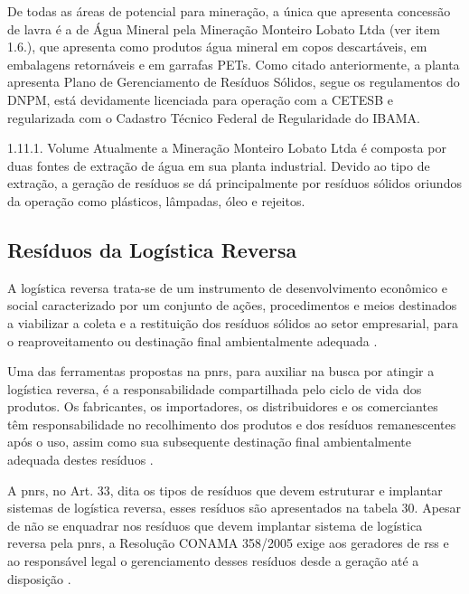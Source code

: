	De todas as áreas de potencial para mineração, a única que apresenta concessão de lavra é a de Água Mineral pela Mineração Monteiro Lobato Ltda (ver item 1.6.), que apresenta como produtos água mineral em copos descartáveis, em embalagens retornáveis e em garrafas PETs. Como citado anteriormente, a planta apresenta Plano de Gerenciamento de Resíduos Sólidos, segue os regulamentos do DNPM, está devidamente licenciada para operação com a CETESB e regularizada com o Cadastro Técnico Federal de Regularidade do IBAMA.
	
	1.11.1. Volume
	Atualmente a Mineração Monteiro Lobato Ltda é composta por duas fontes de extração de água em sua planta industrial. Devido ao tipo de extração, a geração de resíduos se dá principalmente por resíduos sólidos oriundos da operação como plásticos, lâmpadas, óleo e rejeitos.
	
	
	\subsection{Resíduos da Logística Reversa}
	A logística reversa trata-se de um instrumento de desenvolvimento econômico e social caracterizado por um conjunto de ações, procedimentos e meios destinados a viabilizar a coleta e a restituição dos resíduos sólidos ao setor empresarial, para o reaproveitamento ou destinação final ambientalmente adequada \cite{brasil:12305}. 
	
	Uma das ferramentas propostas na \gls{pnrs}, para auxiliar na busca por atingir a logística reversa, é a responsabilidade compartilhada pelo ciclo de vida dos produtos. Os fabricantes, os importadores, os distribuidores e os comerciantes têm responsabilidade no recolhimento dos produtos e dos resíduos remanescentes após o uso, assim como sua subsequente destinação final ambientalmente adequada destes resíduos \cite{brasil:12305}.
	
	A \gls{pnrs}, no Art. 33, dita os tipos de resíduos que devem estruturar e implantar sistemas de logística reversa, esses resíduos são apresentados na tabela 30. Apesar de não se enquadrar nos resíduos que devem implantar sistema de logística reversa pela \gls{pnrs}, a Resolução CONAMA 358/2005 exige aos geradores de \gls{rss} e ao responsável legal o gerenciamento desses resíduos desde a geração até a disposição \cite{conama:358}.
	
	
	
